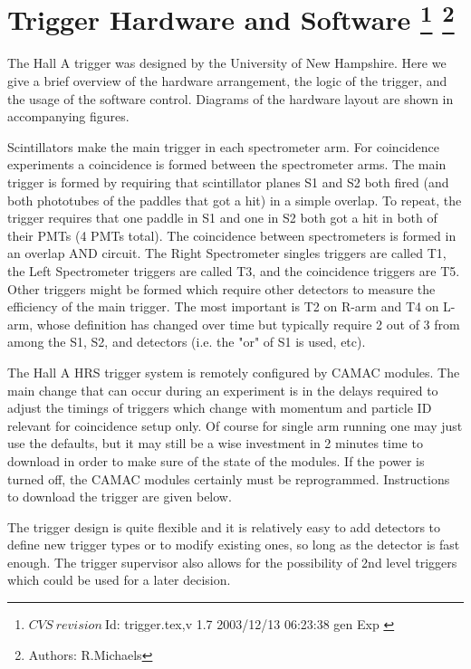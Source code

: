 \chapter[Trigger Hardware and Software]{Trigger Hardware and Software
\footnote{
  $CVS~revision~ $Id: trigger.tex,v 1.7 2003/12/13 06:23:38 gen Exp $ $
}
\footnote{Authors: R.Michaels }
}

\par
The Hall A trigger was designed by the
University of New Hampshire.
Here we give a brief overview of the 
hardware arrangement,
the logic of the trigger, and the usage
of the software control.
Diagrams of the hardware layout are shown in
accompanying figures.

\par

Scintillators make the main trigger 
in each spectrometer arm. For coincidence experiments a 
coincidence is formed between the spectrometer arms.   
The main trigger is formed by requiring that scintillator 
planes S1 and S2 both fired (and both phototubes of the 
paddles that got a hit) in a simple overlap. To repeat, 
the trigger requires that one paddle in S1 and one in 
S2 both got a hit in both of their PMTs (4 PMTs total).  
The coincidence between spectrometers is formed in an 
overlap AND circuit.  The Right Spectrometer singles 
triggers are called T1, the Left Spectrometer triggers 
are called T3, and the coincidence triggers are T5.   
Other triggers might be formed which require other detectors 
to measure the efficiency of the main trigger. The most 
important is T2 on R-arm and T4 on L-arm, whose definition 
has changed over time but typically require 2 out of 3 
from among the S1, S2, and \Cherenkov{} detectors (i.e. the 
"or" of S1 is used, etc).

The Hall A HRS trigger system is remotely configured by 
CAMAC modules.   The main change that can occur during 
an experiment is in the delays required to adjust the 
timings of triggers which change with momentum and 
particle ID relevant for coincidence setup only.   
Of course for single arm running one may just use the 
defaults, but it may still be a wise investment in 2 
minutes time to download in order to make sure of 
the state of the modules.   If the power is turned off, 
the CAMAC modules certainly must be reprogrammed. 
Instructions to download the trigger are given below.

The trigger design is quite flexible and it
is relatively easy to add detectors to define
new trigger types or to modify existing ones,
so long as the detector is fast enough.
The trigger supervisor also allows for the
possibility of 2nd level triggers which could
be used for a later decision.


